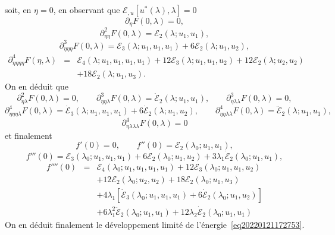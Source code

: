 \documentclass[12pt, final]{amsart}
\begin{document}
soit, en $\eta = 0$, en observant que $\mathcal{E}_{, u} [u^{\ast} (\lambda),
\lambda] = 0$
\begin{equation}
  \partial_{\eta} F (0, \lambda) = 0,
\end{equation}
\begin{equation}
  \partial_{\eta  \eta}^2 F (0, \lambda) =\mathcal{E}_2 (\lambda ;
  u_1, u_1),
\end{equation}
\begin{equation}
  \partial_{\eta  \eta  \eta}^3 F (0, \lambda) =\mathcal{E}_3
  (\lambda ; u_1, u_1, u_1) + 6\mathcal{E}_2 (\lambda ; u_1, u_2),
\end{equation}
\begin{eqnarray}
  \partial_{\eta  \eta  \eta  \eta}^4 F (\eta,
  \lambda) & = & \mathcal{E}_4 (\lambda ; u_1, u_1, u_1, u_1) +
  12\mathcal{E}_3 (\lambda ; u_1, u_1, u_2) + 12\mathcal{E}_2 (\lambda ; u_2,
  u_2) \nonumber\\
  &  & + 18\mathcal{E}_2 (\lambda ; u_1, u_3) .
\end{eqnarray}
On en d{\'e}duit que
\begin{equation}
  \partial_{\eta  \lambda}^2 F (0, \lambda) = 0, \qquad \partial_{\eta
   \eta  \lambda}^3 F (0, \lambda) = \dot{\mathcal{E}}_2
  (\lambda ; u_1, u_1), \qquad \partial_{\eta  \lambda
  \lambda}^3 F (0, \lambda) = 0,
\end{equation}
\begin{equation}
  \partial_{\eta  \eta  \eta  \lambda}^4 F (0,
  \lambda) = \dot{\mathcal{E}}_3 (\lambda ; u_1, u_1, u_1) + 6
  \dot{\mathcal{E}}_2 (\lambda ; u_1, u_2), \qquad \partial_{\eta
  \eta  \lambda  \lambda}^4 F (0, \lambda) =
  \ddot{\mathcal{E}}_2 (\lambda ; u_1, u_1),
\end{equation}
\begin{equation}
  \partial_{\eta  \lambda  \lambda  \lambda}^4 F (0,
  \lambda) = 0
\end{equation}
et finalement
\begin{equation}
  f' (0) = 0, \qquad f'' (0) =\mathcal{E}_2 (\lambda_0 ; u_1, u_1),
\end{equation}
\begin{equation}
  f''' (0) =\mathcal{E}_3 (\lambda_0 ; u_1, u_1, u_1) + 6\mathcal{E}_2
  (\lambda_0 ; u_1, u_2) + 3 \lambda_1  \dot{\mathcal{E}}_2 (\lambda_0 ; u_1,
  u_1),
\end{equation}
\begin{eqnarray}
  f'''' (0) & = & \mathcal{E}_4 (\lambda_0 ; u_1, u_1, u_1, u_1) +
  12\mathcal{E}_3 (\lambda_0 ; u_1, u_1, u_2) \nonumber\\
  &  & + 12\mathcal{E}_2 (\lambda_0 ; u_2, u_2) + 18\mathcal{E}_2 (\lambda_0
  ; u_1, u_3) \nonumber\\
  &  & + 4 \lambda_1  [\dot{\mathcal{E}}_3 (\lambda_0 ; u_1, u_1, u_1) + 6
  \dot{\mathcal{E}}_2 (\lambda_0 ; u_1, u_2)] \nonumber\\
  &  & + 6 \lambda_1^2  \ddot{\mathcal{E}}_2 (\lambda_0 ; u_1, u_1) + 12
  \lambda_2  \dot{\mathcal{E}}_2 (\lambda_0 ; u_1, u_1)
\end{eqnarray}
On en d{\'e}duit finalement le d{\'e}veloppement limit{\'e} de
l'{\'e}nergie~\eqref{eq20220121172753}.
\end{document}
